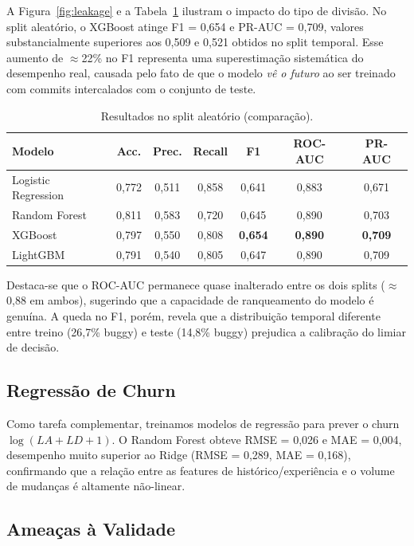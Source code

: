 \documentclass[12pt]{article}
\begin{document}
A Figura~\ref{fig:leakage} e a Tabela~\ref{tab:random} ilustram o impacto do tipo de
divisão. No split aleatório, o XGBoost atinge F1 = 0,654 e PR-AUC = 0,709, valores
substancialmente superiores aos 0,509 e 0,521 obtidos no split temporal.
Esse aumento de $\approx$22\% no F1 representa uma superestimação sistemática do
desempenho real, causada pelo fato de que o modelo \textit{vê o futuro} ao ser
treinado com commits intercalados com o conjunto de teste.

\begin{table}[H]
\centering
\caption{Resultados no split aleatório (comparação).}
\label{tab:random}
\begin{tabular}{lcccccc}
\toprule
\textbf{Modelo} & \textbf{Acc.} & \textbf{Prec.} & \textbf{Recall} & \textbf{F1} & \textbf{ROC-AUC} & \textbf{PR-AUC} \\
\midrule
Logistic Regression & 0,772 & 0,511 & 0,858 & 0,641 & 0,883 & 0,671 \\
Random Forest       & 0,811 & 0,583 & 0,720 & 0,645 & 0,890 & 0,703 \\
XGBoost             & 0,797 & 0,550 & 0,808 & \textbf{0,654} & \textbf{0,890} & \textbf{0,709} \\
LightGBM            & 0,791 & 0,540 & 0,805 & 0,647 & 0,890 & 0,709 \\
\bottomrule
\end{tabular}
\end{table}

Destaca-se que o ROC-AUC permanece quase inalterado entre os dois splits
($\approx$0,88 em ambos), sugerindo que a capacidade de ranqueamento do modelo
é genuína. A queda no F1, porém, revela que a distribuição temporal diferente entre
treino (26,7\% buggy) e teste (14,8\% buggy) prejudica a calibração do limiar de decisão.

\subsection{Regressão de Churn}

Como tarefa complementar, treinamos modelos de regressão para prever o churn
$\log(LA+LD+1)$. O Random Forest obteve RMSE = 0,026 e MAE = 0,004, desempenho
muito superior ao Ridge (RMSE = 0,289, MAE = 0,168), confirmando que a relação
entre as features de histórico/experiência e o volume de mudanças é altamente
não-linear.

\subsection{Ameaças à Validade}
\end{document}
